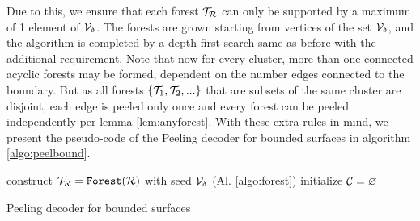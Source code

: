 Due to this, we ensure that each forest $\mathcal{T}_{\mathcal{R}}$ can only be supported by a maximum of 1 element of $\mathcal{V}_\delta$. The forests are grown starting from vertices of the set $\mathcal{V}_\delta$, and the algorithm is completed by a depth-first search same as before with the additional requirement. Note that now for every cluster, more than one connected acyclic forests may be formed, dependent on the number edges connected to the boundary. But as all forests $\{\mathcal{T}_1, \mathcal{T}_2,...\}$ that are subsets of the same cluster are disjoint, each edge is peeled only once and every forest can be peeled independently per lemma \ref{lem:anyforest}. With these extra rules in mind, we present the pseudo-code of the Peeling decoder for bounded surfaces in algorithm \ref{algo:peelbound}.

\begin{algorithm}[htb]
  \BlankLine
  \BlankLine
  construct $\mathcal{T}_{\mathcal{R}} = \texttt{Forest}(\mathcal{R})$ with seed $\mathcal{V}_\delta$ (Al. \ref{algo:forest})\;
  initialize $\mathcal{C} = {\varnothing}$\;
  \BlankLine
  \caption{Peeling decoder for bounded surfaces \cite{delfosse2017linear}}\label{algo:peelbound}
\end{algorithm}






